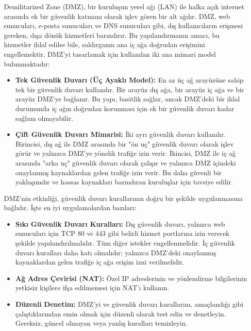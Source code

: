 Demilitarized Zone (DMZ), bir kuruluşun yerel ağı (LAN) ile halka açık internet arasında ek bir güvenlik katmanı olarak işlev gören bir alt ağdır. DMZ, web sunucuları, e-posta sunucuları ve DNS sunucuları gibi, dış kullanıcıların erişmesi gereken, dışa dönük hizmetleri barındırır. Bu yapılandırmanın amacı, bu hizmetler ihlal edilse bile, saldırganın ana iç ağa doğrudan erişimini engellemektir.
DMZ'yi tasarlamak için kullanılan iki ana mimari model bulunmaktadır:

\begin{itemize}
\item \textbf{Tek Güvenlik Duvarı (Üç Ayaklı Model):} En az üç ağ arayüzüne sahip tek bir güvenlik duvarı kullanılır. Bir arayüz dış ağa, bir arayüz iç ağa ve bir arayüz DMZ'ye bağlanır. Bu yapı, basitlik sağlar, ancak DMZ'deki bir ihlal durumunda iç ağın doğrudan korunması için ek bir güvenlik duvarı kadar sağlam olmayabilir.
\item \textbf{Çift Güvenlik Duvarı Mimarisi:} İki ayrı güvenlik duvarı kullanılır. Birincisi, dış ağ ile DMZ arasında bir "ön uç" güvenlik duvarı olarak işlev görür ve yalnızca DMZ'ye yönelik trafiğe izin verir. İkincisi, DMZ ile iç ağ arasında "arka uç" güvenlik duvarı olarak çalışır ve yalnızca DMZ içindeki onaylanmış kaynaklardan gelen trafiğe izin verir. Bu daha güvenli bir yaklaşımdır ve hassas kaynakları barındıran kuruluşlar için tavsiye edilir.
\end{itemize}

DMZ'nin etkinliği, güvenlik duvarı kurallarının doğru bir şekilde uygulanmasına bağlıdır. İşte en iyi uygulamalardan bazıları:

\begin{itemize}
\item \textbf{Sıkı Güvenlik Duvarı Kuralları:} Dış güvenlik duvarı, yalnızca web sunucuları için TCP 80 ve 443 gibi belirli hizmet portlarına izin verecek şekilde yapılandırılmalıdır. Tüm diğer istekler engellenmelidir. İç güvenlik duvarı kuralları daha katı olmalıdır; yalnızca DMZ'deki onaylanmış kaynaklardan gelen trafiğe iç ağa erişim izni verilmelidir.
\item \textbf{Ağ Adres Çevirisi (NAT):} Özel IP adreslerinin ve yönlendirme bilgilerinin yetkisiz kişilere ifşa edilmemesi için NAT'ı kullanın.
\item \textbf{Düzenli Denetim:} DMZ'yi ve güvenlik duvarı kurallarını, amaçlandığı gibi çalıştıklarından emin olmak için düzenli olarak test edin ve denetleyin. Gereksiz, güncel olmayan veya yanlış kuralları temizleyin.
\end{itemize}

